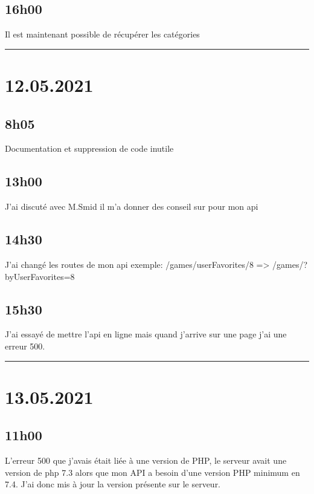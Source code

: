 \documentclass[a4paper,12pt,french]{sphinxmanual}
\begin{document}
\subsection{16h00}
\label{\detokenize{logbook:id103}}
\sphinxAtStartPar
Il est maintenant possible de récupérer les catégories


\bigskip\hrule\bigskip



\section{12.05.2021}
\label{\detokenize{logbook:id104}}

\subsection{8h05}
\label{\detokenize{logbook:id105}}
\sphinxAtStartPar
Documentation et suppression de code inutile


\subsection{13h00}
\label{\detokenize{logbook:id106}}
\sphinxAtStartPar
J’ai discuté avec M.Smid il m’a donner des conseil sur pour mon api


\subsection{14h30}
\label{\detokenize{logbook:id107}}
\sphinxAtStartPar
J’ai changé les routes de mon api
exemple:
/games/userFavorites/8  => /games/?byUserFavorites=8


\subsection{15h30}
\label{\detokenize{logbook:id108}}
\sphinxAtStartPar
J’ai essayé de mettre l’api en ligne mais quand j’arrive sur une page j’ai une erreur 500.


\bigskip\hrule\bigskip



\section{13.05.2021}
\label{\detokenize{logbook:id109}}

\subsection{11h00}
\label{\detokenize{logbook:id110}}
\sphinxAtStartPar
L’erreur 500 que j’avais était liée à une version de PHP, le serveur avait une version de php 7.3 alors que mon API a besoin d’une version PHP minimum en 7.4.
J’ai donc mis à jour la version présente sur le serveur.
\end{document}
